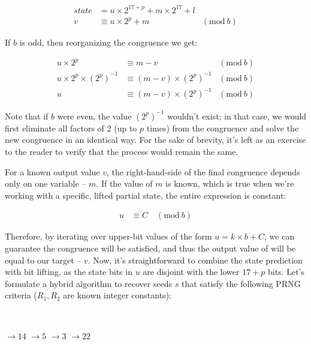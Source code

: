 \documentclass{article}
\begin{document}
\begin{align*}
    state & = u \times 2^{17+p} + m \times 2^{17} + l \\
    v & \equiv u \times 2^p + m & (\text{mod}\ b)
\end{align*}

\noindent If $b$ is odd, then reorganizing the congruence we get:

\begin{align*}
    u \times 2^p & \equiv m - v & (\text{mod}\ b) \\
    u \times 2^p \times (2^p)^{-1} & \equiv (m - v) \times (2^p)^{-1} & (\text{mod}\ b) \\
    u & \equiv (m - v) \times (2^p)^{-1} & (\text{mod}\ b)
\end{align*}

\noindent Note that if $b$ were even, the value $(2^p)^{-1}$ wouldn't exist; in that case, we would first eliminate all factors of 2 (up to $p$ times) from the congruence and solve the new congruence in an identical way. For the sake of brevity, it's left as an exercise to the reader to verify that the process would remain the same.

For a known output value $v$, the right-hand-side of the final congruence depends only on one variable -- $m$. If the value of $m$ is known, which is true when we're working with a specific, lifted partial state, the entire expression is constant:

\begin{align*}
    u & \equiv C \quad (\text{mod}\ b)
\end{align*}

\noindent Therefore, by iterating over upper-bit values of the form $u = k \times b + C$, we can guarantee the congruence will be satisfied, and thus the output value of  will be equal to our target -- $v$. Now, it's straightforward to combine the state prediction with bit lifting, as the state bits in $u$ are disjoint with the lower $17+p$ bits. Let's formulate a hybrid algorithm to recover seeds $s$ that satisfy the following PRNG criteria ($R_1, R_2$ are known integer constants):

\
\begin{samepage}
\begin{algorithmic}
\State {}
\State {} $\to 14$
\State \Call{nextInt}{25} $\to 5$
\State {}
\State {} $\to 3$
\State \Call{nextInt}{24} $\to 22$

\end{algorithmic}
\end{samepage}
\ \
\end{document}
